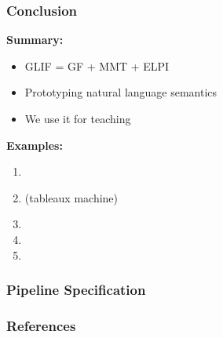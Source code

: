 \documentclass[aspectratio=169]{beamer}
\begin{document}





\begin{frame}
    \frametitle{Conclusion}
    \begin{minipage}[t]{0.5\textwidth}
        \textbf{Summary:}
        \begin{itemize}
            \item GLIF = GF + MMT + ELPI
            \item Prototyping natural language semantics%
            \item We use it for teaching
        \end{itemize}
    \end{minipage}
    \begin{minipage}[t]{0.49\textwidth}
        \textbf{Examples:}
        \begin{enumerate}
            \item {}
            \item {} (tableaux machine)
            \item {}
            \item {}
            \item {}
        \end{enumerate}
    \end{minipage}
    
    \vspace{1em}
    \centering
    
\end{frame}

\appendix

\begin{frame}
    \frametitle{Pipeline Specification}
    
\end{frame}





\begin{frame}[allowframebreaks,t]
    \frametitle{References}
    \printbibliography
\end{frame}
\end{document}
